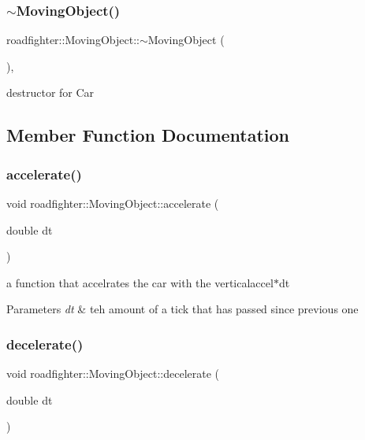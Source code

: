 \subsubsection{\texorpdfstring{$\sim$\+Moving\+Object()}{~MovingObject()}}
{\footnotesize\ttfamily roadfighter\+::\+Moving\+Object\+::$\sim$\+Moving\+Object (\begin{DoxyParamCaption}{ }\end{DoxyParamCaption})\hspace{0.3cm}{\ttfamily [override]}, {\ttfamily [default]}}

destructor for Car 

\subsection{Member Function Documentation}
\mbox{\label{classroadfighter_1_1MovingObject_ab516489c0569b625c41a1bb9cac19d97}} 
\subsubsection{\texorpdfstring{accelerate()}{accelerate()}}
{\footnotesize\ttfamily void roadfighter\+::\+Moving\+Object\+::accelerate (\begin{DoxyParamCaption}\item[{double}]{dt }\end{DoxyParamCaption})\hspace{0.3cm}{\ttfamily [virtual]}}

a function that accelrates the car with the verticalaccel$\ast$dt 
\begin{DoxyParams}{Parameters}
{\em dt} & teh amount of a tick that has passed since previous one \\
\hline
\end{DoxyParams}
\mbox{\label{classroadfighter_1_1MovingObject_a8183bcad61477b6cba13b70d6dbf6b84}} 
\subsubsection{\texorpdfstring{decelerate()}{decelerate()}}
{\footnotesize\ttfamily void roadfighter\+::\+Moving\+Object\+::decelerate (\begin{DoxyParamCaption}\item[{double}]{dt }\end{DoxyParamCaption})\hspace{0.3cm}{\ttfamily [virtual]}}

